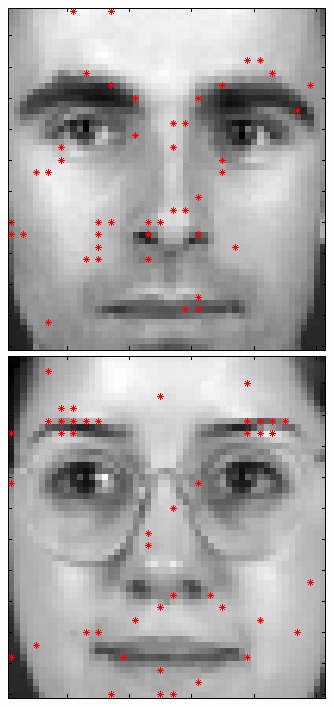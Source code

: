 \begin{figure}[ht]
 \includegraphics[width=\textwidth*11/100]{ch5/figures/FeaturesonFace_BGC5.png}
 \includegraphics[width=\textwidth*11/100]{ch5/figures/FeaturesonFace_BGC6.png}

\end{figure}
